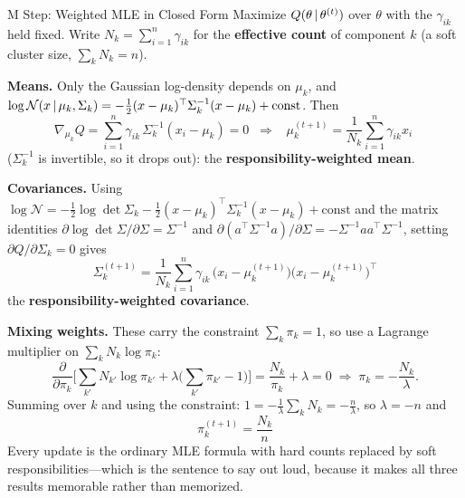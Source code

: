 \begin{mathresult}{M Step: Weighted MLE in Closed Form}
Maximize $Q(\theta \,|\, \theta^{(t)})$ over $\theta$ with the $\gamma_{ik}$ held fixed. Write $N_k = \sum_{i=1}^n \gamma_{ik}$ for the \textbf{effective count} of component $k$ (a soft cluster size, $\sum_k N_k = n$).

\textbf{Means.} Only the Gaussian log-density depends on $\mu_k$, and $\log \mathcal{N}(x \,|\, \mu_k, \Sigma_k) = -\tfrac{1}{2}(x-\mu_k)^\top \Sigma_k^{-1}(x - \mu_k) + \text{const}$. Then
\begin{equation}
\nabla_{\mu_k} Q = \sum_{i=1}^n \gamma_{ik}\, \Sigma_k^{-1}(x_i - \mu_k) = 0
\;\;\Longrightarrow\;\;
\boxed{\;\mu_k^{(t+1)} = \frac{1}{N_k}\sum_{i=1}^n \gamma_{ik} x_i \;}
\end{equation}
($\Sigma_k^{-1}$ is invertible, so it drops out): the \textbf{responsibility-weighted mean}.

\textbf{Covariances.} Using $\log \mathcal{N} = -\tfrac{1}{2}\log\det\Sigma_k - \tfrac{1}{2}(x-\mu_k)^\top\Sigma_k^{-1}(x-\mu_k) + \text{const}$ and the matrix identities $\partial \log\det \Sigma / \partial \Sigma = \Sigma^{-1}$ and $\partial (a^\top \Sigma^{-1} a)/\partial \Sigma = -\Sigma^{-1} a a^\top \Sigma^{-1}$, setting $\partial Q/\partial \Sigma_k = 0$ gives
\begin{equation}
\boxed{\;\Sigma_k^{(t+1)} = \frac{1}{N_k}\sum_{i=1}^n \gamma_{ik}\,\big(x_i - \mu_k^{(t+1)}\big)\big(x_i - \mu_k^{(t+1)}\big)^\top \;}
\end{equation}
the \textbf{responsibility-weighted covariance}.

\textbf{Mixing weights.} These carry the constraint $\sum_k \pi_k = 1$, so use a Lagrange multiplier on $\sum_k N_k \log \pi_k$:
\begin{equation}
\frac{\partial}{\partial \pi_k}\Big[\sum_{k'} N_{k'}\log \pi_{k'} + \lambda\Big(\sum_{k'}\pi_{k'} - 1\Big)\Big] = \frac{N_k}{\pi_k} + \lambda = 0 \;\Longrightarrow\; \pi_k = -\frac{N_k}{\lambda}.
\end{equation}
Summing over $k$ and using the constraint: $1 = -\frac{1}{\lambda}\sum_k N_k = -\frac{n}{\lambda}$, so $\lambda = -n$ and
\begin{equation}
\boxed{\;\pi_k^{(t+1)} = \frac{N_k}{n}\;}
\end{equation}
Every update is the ordinary MLE formula with hard counts replaced by soft responsibilities---which is the sentence to say out loud, because it makes all three results memorable rather than memorized.
\end{mathresult}

